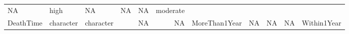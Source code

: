 \documentclass[
]{article}
\begin{document}
\begin{longtable}[]{@{}lllrrrlrrrl@{}}
\begin{minipage}[t]{0.05\columnwidth}
NA\strut
\end{minipage} & \begin{minipage}[t]{0.07\columnwidth}\raggedright
high\strut
\end{minipage} & \begin{minipage}[t]{0.05\columnwidth}\raggedleft
NA\strut
\end{minipage} & \begin{minipage}[t]{0.05\columnwidth}\raggedleft
NA\strut
\end{minipage} & \begin{minipage}[t]{0.05\columnwidth}\raggedleft
NA\strut
\end{minipage} & \begin{minipage}[t]{0.06\columnwidth}\raggedright
moderate\strut
\end{minipage}\tabularnewline
\begin{minipage}[t]{0.10\columnwidth}\raggedright
DeathTime\strut
\end{minipage} & \begin{minipage}[t]{0.07\columnwidth}\raggedright
character\strut
\end{minipage} & \begin{minipage}[t]{0.06\columnwidth}\raggedright
character\strut
\end{minipage} & \begin{minipage}[t]{0.08\columnwidth}\raggedleft
250\strut
\end{minipage} & \begin{minipage}[t]{0.06\columnwidth}\raggedleft
NA\strut
\end{minipage} & \begin{minipage}[t]{0.05\columnwidth}\raggedleft
NA\strut
\end{minipage} & \begin{minipage}[t]{0.07\columnwidth}\raggedright
MoreThan1Year\strut
\end{minipage} & \begin{minipage}[t]{0.05\columnwidth}\raggedleft
NA\strut
\end{minipage} & \begin{minipage}[t]{0.05\columnwidth}\raggedleft
NA\strut
\end{minipage} & \begin{minipage}[t]{0.05\columnwidth}\raggedleft
NA\strut
\end{minipage} & \begin{minipage}[t]{0.06\columnwidth}\raggedright
Within1Year\strut
\end{minipage}\tabularnewline
\bottomrule
\end{longtable}
\end{document}
